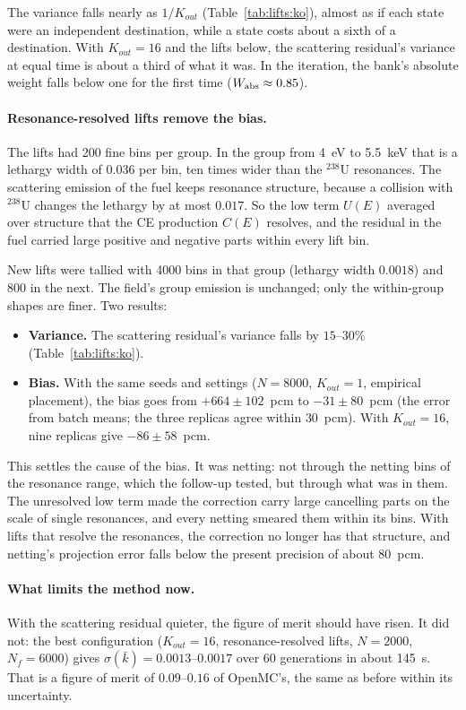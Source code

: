 The variance falls nearly as $1/K_{out}$ (Table~\ref{tab:lifts:ko}), almost as if each state were an
independent destination, while a state costs about a sixth of a destination. With $K_{out}=16$ and the
lifts below, the scattering residual's variance at equal time is about a third of what it was. In the
iteration, the bank's absolute weight falls below one for the first time ($W_{\mathrm{abs}}\approx0.85$).

\paragraph{Resonance-resolved lifts remove the bias.} The lifts had 200 fine bins per group. In the
group from 4~eV to 5.5~keV that is a lethargy width of $0.036$ per bin, ten times wider than the
$^{238}$U resonances. The scattering emission of the fuel keeps resonance structure, because a
collision with $^{238}$U changes the lethargy by at most $0.017$. So the low term $U(E)$ averaged
over structure that the CE production $C(E)$ resolves, and the residual in the fuel carried large
positive and negative parts within every lift bin.

New lifts were tallied with 4000 bins in that group (lethargy width $0.0018$) and 800 in the next.
The field's group emission is unchanged; only the within-group shapes are finer. Two results:
\begin{itemize}
\item \textbf{Variance.} The scattering residual's variance falls by $15$--$30\%$
  (Table~\ref{tab:lifts:ko}).
\item \textbf{Bias.} With the same seeds and settings ($N=8000$, $K_{out}=1$, empirical placement),
  the bias goes from $+664\pm102$~pcm to $-31\pm80$~pcm (the error from batch means; the three
  replicas agree within $30$~pcm). With $K_{out}=16$, nine replicas give $-86\pm58$~pcm.
\end{itemize}
This settles the cause of the bias. It was netting: not through the netting bins of the resonance
range, which the follow-up tested, but through what was in them. The unresolved low term made the
correction carry large cancelling parts on the scale of single resonances, and every netting
smeared them within its bins. With lifts that resolve the resonances, the correction no longer has
that structure, and netting's projection error falls below the present precision of about 80~pcm.

\paragraph{What limits the method now.} With the scattering residual quieter, the figure of merit
should have risen. It did not: the best configuration ($K_{out}=16$, resonance-resolved lifts,
$N=2000$, $N_f=6000$) gives $\sigma(\bar k)=0.0013$--$0.0017$ over 60 generations in about 145~s. That
is a figure of merit of $0.09$--$0.16$ of OpenMC's, the same as before within its uncertainty.

